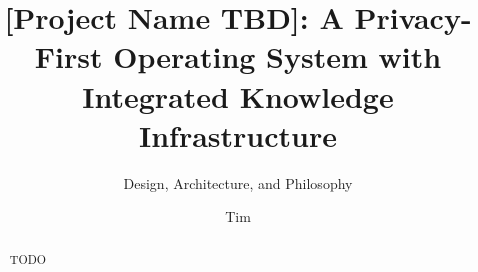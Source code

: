 \documentclass[english,submission]{programming}
\title{[Project Name TBD]: A Privacy-First Operating System with Integrated Knowledge Infrastructure}
\subtitle{Design, Architecture, and Philosophy}
\author{Tim}
\affiliation{University of Innsbruck, Austria}
\begin{document}
\maketitle

\begin{abstract}
TODO
\end{abstract}












\printbibliography
\end{document}
